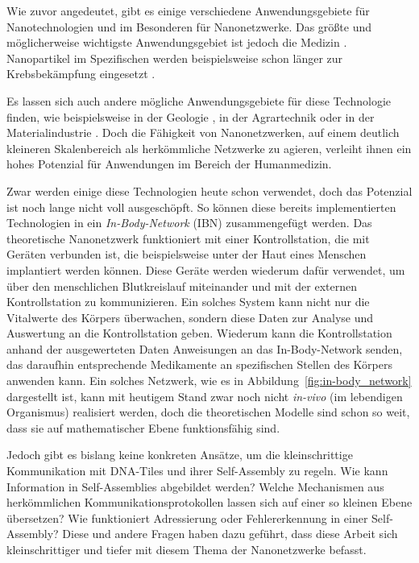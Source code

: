 Wie zuvor angedeutet, gibt es einige verschiedene Anwendungsgebiete für Nanotechnologien und im Besonderen für Nanonetzwerke.
Das größte und möglicherweise wichtigste Anwendungsgebiet ist jedoch die Medizin \cite{gu2013diabetes,li2018nanorobo,wang2015light,yao2017factors}.
Nanopartikel im Spezifischen werden beispielsweise schon länger zur Krebsbekämpfung eingesetzt \cite{singhal2010cancer}.

Es lassen sich auch andere mögliche Anwendungsgebiete für diese Technologie finden, wie beispielsweise in der Geologie \cite{jin2019mapping}, in der Agrartechnik \cite{almpanis2019agent,axelos2017agri} oder in der Materialindustrie \cite{ma2010qca,taibi2019light}. Doch die Fähigkeit von Nanonetzwerken, auf einem deutlich kleineren Skalenbereich als herkömmliche Netzwerke zu agieren, verleiht ihnen ein hohes Potenzial für Anwendungen im Bereich der Humanmedizin.

Zwar werden einige diese Technologien heute schon verwendet, doch das Potenzial ist noch lange nicht voll ausgeschöpft.
So können diese bereits implementierten Technologien in ein \emph{In-Body-Network} (IBN) zusammengefügt werden.
Das theoretische Nanonetzwerk funktioniert mit einer Kontrollstation, die mit Geräten verbunden ist, die beispielsweise unter der Haut eines Menschen implantiert werden können.
Diese Geräte werden wiederum dafür verwendet, um über den menschlichen Blutkreislauf miteinander und mit der externen Kontrollstation zu kommunizieren.
Ein solches System kann nicht nur die Vitalwerte des Körpers überwachen, sondern diese Daten zur Analyse und Auswertung an die Kontrollstation geben.
Wiederum kann die Kontrollstation anhand der ausgewerteten Daten Anweisungen an das In-Body-Network senden, das daraufhin entsprechende Medikamente an spezifischen Stellen des Körpers anwenden kann.
Ein solches Netzwerk, wie es in Abbildung~\ref{fig:in-body_network} dargestellt ist, kann mit heutigem Stand zwar noch nicht \emph{in-vivo} (im lebendigen Organismus) realisiert werden, doch die theoretischen Modelle sind schon so weit, dass sie auf mathematischer Ebene funktionsfähig sind.

Jedoch gibt es bislang keine konkreten Ansätze, um die kleinschrittige Kommunikation mit DNA-Tiles und ihrer Self-Assembly zu regeln. Wie kann Information in Self-Assemblies abgebildet werden? Welche Mechanismen aus herkömmlichen Kommunikationsprotokollen lassen sich auf einer so kleinen Ebene übersetzen? Wie funktioniert Adressierung oder Fehlererkennung in einer Self-Assembly? Diese und andere Fragen haben dazu geführt, dass diese Arbeit sich kleinschrittiger und tiefer mit diesem Thema der Nanonetzwerke befasst.

